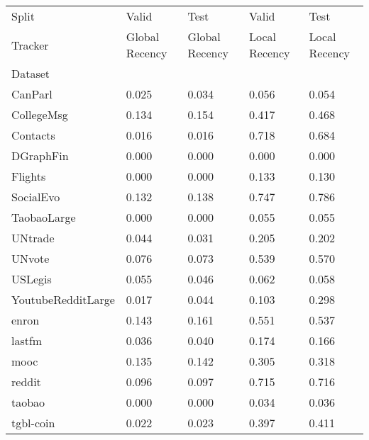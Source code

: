 \begin{tabular}{lllll}
\toprule
Split &          Valid &           Test &         Valid &          Test \\
Tracker & Global Recency & Global Recency & Local Recency & Local Recency \\
Dataset            &                &                &               &               \\
\midrule
CanParl            &          0.025 &          0.034 &         0.056 &         0.054 \\
CollegeMsg         &          0.134 &          0.154 &         0.417 &         0.468 \\
Contacts           &          0.016 &          0.016 &         0.718 &         0.684 \\
DGraphFin          &          0.000 &          0.000 &         0.000 &         0.000 \\
Flights            &          0.000 &          0.000 &         0.133 &         0.130 \\
SocialEvo          &          0.132 &          0.138 &         0.747 &         0.786 \\
TaobaoLarge        &          0.000 &          0.000 &         0.055 &         0.055 \\
UNtrade            &          0.044 &          0.031 &         0.205 &         0.202 \\
UNvote             &          0.076 &          0.073 &         0.539 &         0.570 \\
USLegis            &          0.055 &          0.046 &         0.062 &         0.058 \\
YoutubeRedditLarge &          0.017 &          0.044 &         0.103 &         0.298 \\
enron              &          0.143 &          0.161 &         0.551 &         0.537 \\
lastfm             &          0.036 &          0.040 &         0.174 &         0.166 \\
mooc               &          0.135 &          0.142 &         0.305 &         0.318 \\
reddit             &          0.096 &          0.097 &         0.715 &         0.716 \\
taobao             &          0.000 &          0.000 &         0.034 &         0.036 \\
tgbl-coin          &          0.022 &          0.023 &         0.397 &         0.411 \\

\end{tabular}
